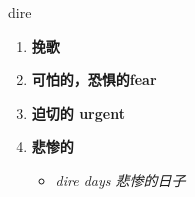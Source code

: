 
\begin{frame}
{\huge dire}
\begin{center}
\begin{enumerate}\Large
  \item \textbf{挽歌}
  \item \textbf{可怕的，恐惧的fear}
  \item \textbf{迫切的 urgent}
  \item \textbf{悲惨的}
  \begin{itemize}
    \item \em{\Large{dire days 悲惨的日子}}
  \end{itemize}
\end{enumerate}
\end{center}
\end{frame}
